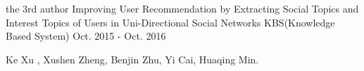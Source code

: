 
\begin{cventries}
  \cventry
    {the 3rd author}
    {Improving User Recommendation by Extracting Social Topics and Interest Topics of Users in Uni-Directional Social Networks}
    {KBS(Knowledge Based System)}
    {Oct. 2015 - Oct. 2016}
    {
      \begin{cvitems}
        \item {Ke Xu , Xushen Zheng, Benjin Zhu, Yi Cai, Huaqing Min.}
      \end{cvitems}
    }
\end{cventries}
